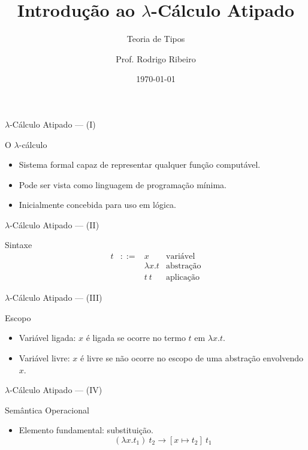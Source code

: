 \documentclass{beamer}
\title{Introdução ao $\lambda$-Cálculo Atipado}
\subtitle{Teoria de Tipos}
\author[Prof. Rodrigo Ribeiro]{Prof. Rodrigo Ribeiro}
\institute{Departamento de Computação e Sistemas}
\date{\today}
\begin{document}
   \begin{frame}
       \titlepage
   \end{frame}
   \begin{frame}{$\lambda$-Cálculo Atipado --- (I)}
      \begin{block}{O $\lambda$-cálculo}
         \begin{itemize}
            \item Sistema formal capaz de representar qualquer função computável.
            \item Pode ser vista como linguagem de programação mínima.
            \item Inicialmente concebida para uso em lógica.
         \end{itemize}
      \end{block}
   \end{frame}
   \begin{frame}{$\lambda$-Cálculo Atipado --- (II)}
      \begin{block}{Sintaxe}
         \[
             \begin{array}{rcll}
                t & ::= & x & \text{variável} \\
                  &     & \lambda x. t & \text{abstração}\\
                  &     & t\:t & \text{aplicação}
             \end{array}
         \]
      \end{block}
   \end{frame}
   \begin{frame}{$\lambda$-Cálculo Atipado --- (III)}
      \begin{block}{Escopo}
         \begin{itemize}
            \item Variável ligada: $x$ é ligada se ocorre no termo $t$ em $\lambda x.t$.
            \item Variável livre: $x$ é livre se não ocorre no escopo de uma abstração envolvendo $x$.
         \end{itemize}
      \end{block}
   \end{frame}
   \begin{frame}{$\lambda$-Cálculo Atipado --- (IV)}
      \begin{block}{Semântica Operacional}
         \begin{itemize}
            \item Elemento fundamental: substituição.
            \[
                 (\lambda x.t_1)\: t_2 \to [x \mapsto t_2]\:t_1
            \]
         \end{itemize}
      \end{block}
   \end{frame}
\end{document}
